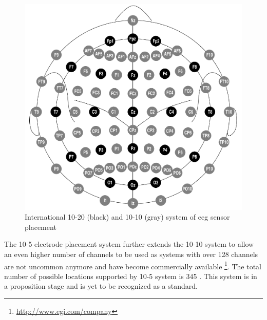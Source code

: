 \begin{figure}[htb]
	\centering
	\includegraphics[width=1\linewidth]{fig/system10-10.png}
	\caption[Caption for LOF]{International 10-20 (black) and 10-10 (gray) system of \gls{eeg} sensor placement\protect\footnotemark}
	\label{fig:system1010}
\end{figure}

The 10-5 electrode placement system further extends the 10-10 system to allow an
even higher number of channels to be used as systems with over 128 channels are
not uncommon anymore and have become commercially available \footnote{\url{http://www.egi.com/company}}.
The total number of possible locations supported by 10-5 system is 345 \cite{placeSys}.
This system is in a proposition stage and is yet to be recognized as a standard.


